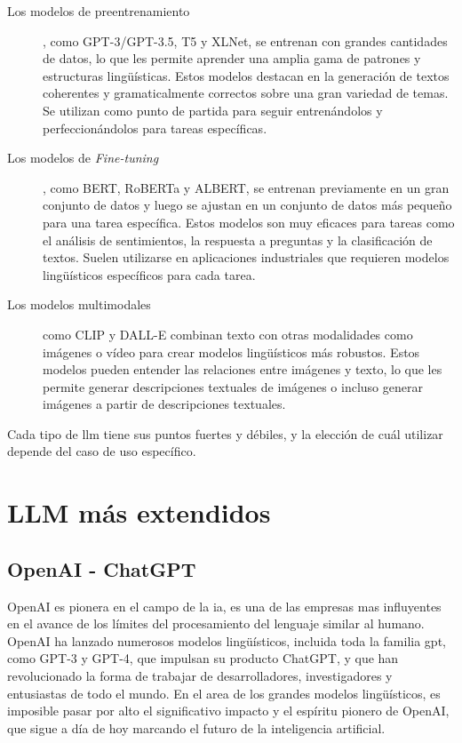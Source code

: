 \begin{description}

\item[Los modelos de preentrenamiento], como GPT-3/GPT-3.5, T5 y XLNet, se entrenan con grandes cantidades de datos, lo que les permite aprender una amplia gama de patrones y estructuras lingüísticas. Estos modelos destacan en la generación de textos coherentes y gramaticalmente correctos sobre una gran variedad de temas. Se utilizan como punto de partida para seguir entrenándolos y perfeccionándolos para tareas específicas.

\item[Los modelos de \textit{Fine-tuning}], como BERT, RoBERTa y ALBERT, se entrenan previamente en un gran conjunto de datos y luego se ajustan en un conjunto de datos más pequeño para una tarea específica. Estos modelos son muy eficaces para tareas como el análisis de sentimientos, la respuesta a preguntas y la clasificación de textos. Suelen utilizarse en aplicaciones industriales que requieren modelos lingüísticos específicos para cada tarea.

\item[Los modelos multimodales] como CLIP y DALL-E combinan texto con otras modalidades como imágenes o vídeo para crear modelos lingüísticos más robustos. Estos modelos pueden entender las relaciones entre imágenes y texto, lo que les permite generar descripciones textuales de imágenes o incluso generar imágenes a partir de descripciones textuales.

\end{description}

Cada tipo de \acrshort{llm} tiene sus puntos fuertes y débiles, y la elección de cuál utilizar depende del caso de uso específico.


\section{LLM más extendidos}

\subsection{OpenAI - ChatGPT}

OpenAI es pionera en el campo de la \acrlong{ia}, es una de las empresas mas influyentes en el avance de los límites del procesamiento del lenguaje similar al humano. OpenAI ha lanzado numerosos modelos lingüísticos, incluida toda la familia \acrshort{gpt}, como GPT-3 y GPT-4, que impulsan su producto ChatGPT, y que han revolucionado la forma de trabajar de desarrolladores, investigadores y entusiastas de todo el mundo. En el area de los grandes modelos lingüísticos, es imposible pasar por alto el significativo impacto y el espíritu pionero de OpenAI, que sigue a día de hoy marcando el futuro de la inteligencia artificial.


